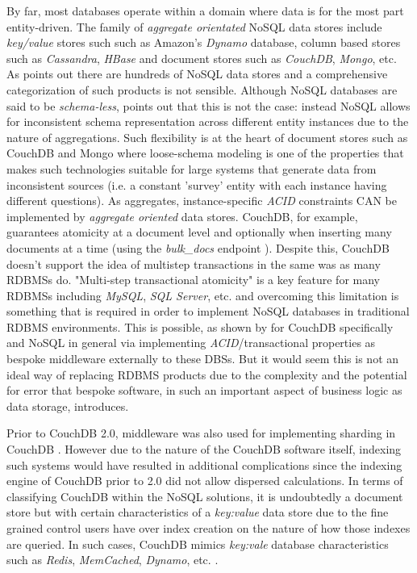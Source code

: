 By far, most databases operate within a domain where data is for the most part entity-driven. The family of \textit{aggregate orientated} NoSQL data stores include \textit{key/value} stores such such as Amazon's \textit{Dynamo} database, column based stores such as \textit{Cassandra}, \textit{HBase} and document stores such as \textit{CouchDB}, \textit{Mongo}, etc. As \cite{GANESHCHANDRA201513} points out there are hundreds of NoSQL data stores and a comprehensive categorization of such products is not sensible. Although NoSQL databases are said to be \textit{schema-less}, \cite{ATZENI2016} points out that this is not the case: instead NoSQL allows for inconsistent schema representation across different entity instances due to the nature of aggregations. Such flexibility is at the heart of document stores such as CouchDB and Mongo where loose-schema modeling is one of the properties that makes such technologies suitable for large systems that generate data from inconsistent sources (i.e. a constant 'survey' entity with each instance having different questions). As aggregates, instance-specific \textit{ACID} constraints CAN be implemented by \textit{aggregate oriented} data stores. CouchDB, for example, guarantees atomicity at a document level and optionally when inserting many documents at a time (using the \textit{bulk\_docs} endpoint \cite{bulkDocs}). Despite this, CouchDB doesn't support the idea of multistep transactions in the same was as many RDBMSs do. "Multi-step transactional atomicity" is a key feature for many RDBMSs including \textit{MySQL}, \textit{SQL Server}, etc. and overcoming this limitation is something that is required in order to implement NoSQL databases in traditional RDBMS environments. This is possible, as shown by \cite{Rashmi2017} for CouchDB specifically and NoSQL in general \cite{LOTFY2016133} via implementing \textit{ACID}/transactional properties as bespoke middleware externally to these DBSs. But it would seem this is not an ideal way of replacing RDBMS products due to the complexity and the potential for error that bespoke software, in such an important aspect of business logic as data storage, introduces.

Prior to CouchDB 2.0, middleware was also used for implementing sharding in CouchDB \cite{CORBELLINI20171}. However due to the nature of the CouchDB software itself, indexing such systems would have resulted in additional complications since the indexing engine of CouchDB prior to 2.0 did not allow dispersed calculations. In terms of classifying CouchDB within the NoSQL solutions, it is undoubtedly a document store but with certain characteristics of a \textit{key:value} data store due to the fine grained control users have over index creation on the nature of how those indexes are queried. In such cases, CouchDB mimics \textit{key:vale} database characteristics such as \textit{Redis}, \textit{MemCached}, \textit{Dynamo}, etc. \cite{MAKRIS201694,CORBELLINI20171,GANESHCHANDRA201513}.


